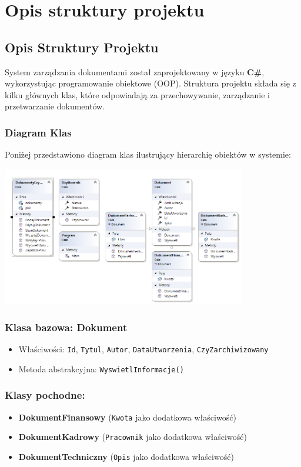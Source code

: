 ﻿%
\chapter{Opis struktury projektu}

\section{Opis Struktury Projektu}
System zarządzania dokumentami został zaprojektowany w języku \textbf{C\#}, wykorzystując programowanie obiektowe (OOP). Struktura projektu składa się z kilku głównych klas, które odpowiadają za przechowywanie, zarządzanie i przetwarzanie dokumentów.


\subsection{Diagram Klas}
Poniżej przedstawiono diagram klas ilustrujący hierarchię obiektów w systemie:

\begin{center}
    \includegraphics[width=0.8\textwidth]{diagramklas.png}
\end{center}


\subsection{Klasa bazowa: Dokument}
\begin{itemize}
\item Właściwości: \texttt{Id}, \texttt{Tytul}, \texttt{Autor}, \texttt{DataUtworzenia}, \texttt{CzyZarchiwizowany}
\item Metoda abstrakcyjna: \texttt{WyswietlInformacje()}
\end{itemize}

\subsection{Klasy pochodne:}
\begin{itemize}
\item \textbf{DokumentFinansowy} (\texttt{Kwota} jako dodatkowa właściwość)
\item \textbf{DokumentKadrowy} (\texttt{Pracownik} jako dodatkowa właściwość)
\item \textbf{DokumentTechniczny} (\texttt{Opis} jako dodatkowa właściwość)
\end{itemize}

